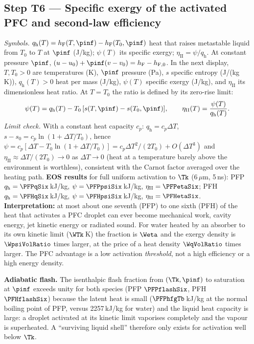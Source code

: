 \subsection{Step T6 --- Specific exergy of the activated PFC and second-law efficiency}
\emph{Symbols.} $q_{\mathrm h}(T)=h_{\mathrm F}(T,\pinf)-h_{\mathrm F}(T_0,\pinf)$ heat that raises metastable liquid from $T_0$ to $T$ at
$\pinf$ (J/kg); $\psi(T)$ its specific exergy; $\eta_{\mathrm{II}}=\psi/q_{\mathrm h}$.
At constant pressure $\pinf$, $(u-u_0)+\pinf(v-v_0)=h_{\mathrm F}-h_{\mathrm F,0}$.
In the next display, $T,T_0>0$ are temperatures (K), $\pinf$ pressure (Pa), $s$ specific entropy
(J/(kg\,K)), $q_{\mathrm h}(T)>0$ heat per mass (J/kg), $\psi(T)$ specific exergy (J/kg), and
$\eta_{\mathrm{II}}$ its dimensionless heat ratio. At $T=T_0$ the ratio is defined by its zero-rise limit:
\begin{equation}
\psi(T)=q_{\mathrm h}(T)-T_0\,[s(T,\pinf)-s(T_0,\pinf)],\qquad \eta_{\mathrm{II}}(T)=\frac{\psi(T)}{q_{\mathrm h}(T)} .\label{eq:psi}
\end{equation}
\emph{Limit check.} With a constant heat capacity $c_p$: $q_{\mathrm h}=c_p\Delta T$,
$s-s_0=c_p\ln(1+\Delta T/T_0)$, hence $\psi=c_p[\Delta T-T_0\ln(1+\Delta T/T_0)]=c_p\Delta T^2/(2T_0)+O(\Delta T^3)$
and $\eta_{\mathrm{II}}\approx\Delta T/(2T_0)\to0$ as $\Delta T\to0$ (heat at a temperature barely above the
environment is worthless), consistent with the Carnot factor averaged over the heating path.
\textbf{EOS results} for full uniform activation to $\Tk$ (6\,$\mu$m, 5\,ns): PFP
$q_{\mathrm h}=\PFPqSix$\,kJ/kg, $\psi=\PFPpsiSix$\,kJ/kg, $\eta_{\mathrm{II}}=\PFPetaSix$; PFH $q_{\mathrm h}=\PFHqSix$\,kJ/kg,
$\psi=\PFHpsiSix$\,kJ/kg, $\eta_{\mathrm{II}}=\PFHetaSix$. \textbf{Interpretation:} at most about one seventh
(PFP) to one sixth (PFH) of the heat that activates a PFC droplet can ever become mechanical work,
cavity energy, jet kinetic energy or radiated sound. For water heated by an absorber to its own kinetic
limit ($\WTk$\,K) the fraction is $\Weta$ and the exergy density is $\WpsiVolRatio$ times larger, at the
price of a heat density $\WqVolRatio$ times larger. The PFC advantage is a low activation \emph{threshold},
not a high efficiency or a high energy density.

\textbf{Adiabatic flash.} The isenthalpic flash fraction from $(\Tk,\pinf)$ to saturation at $\pinf$
exceeds unity for both species (PFP $\PFPflashSix$, PFH $\PFHflashSix$) because the latent heat is small
($\PFPhfgTb$\,kJ/kg at the normal boiling point of PFP, versus 2257\,kJ/kg for water) and the liquid heat
capacity is large: a droplet activated at its kinetic limit vaporises completely and the vapour is
superheated. A ``surviving liquid shell'' therefore only exists for activation well below $\Tk$.

